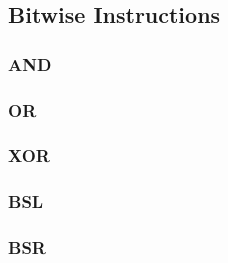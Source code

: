 \subsection{Bitwise Instructions}

\subsubsection{AND }\label{sec:AND}

\subsubsection{OR }\label{sec:OR}
 
\subsubsection{XOR }\label{sec:XOR}

\subsubsection{BSL }\label{sec:BSL}

\subsubsection{BSR }\label{sec:BSR}